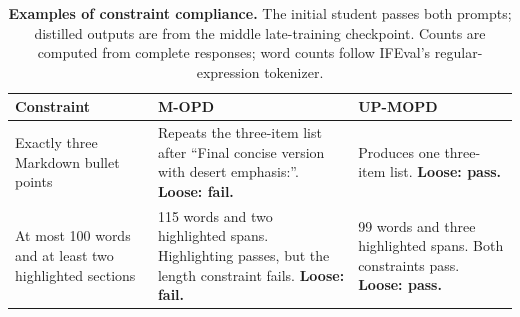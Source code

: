 \documentclass{article}
\begin{document}
\begin{table}[H]
\centering
\small
\setlength{\tabcolsep}{4pt}
\begin{tabularx}{\textwidth}{@{}p{}XX@{}}
\toprule
Constraint & M-OPD & UP-MOPD \\
\midrule
Exactly three Markdown bullet points
& Repeats the three-item list after ``Final concise version with desert emphasis:''. \textbf{Loose: fail.}
& Produces one three-item list. \textbf{Loose: pass.} \\
\addlinespace[5pt]
At most 100 words and at least two highlighted sections
& 115 words and two highlighted spans. Highlighting passes, but the length constraint fails. \textbf{Loose: fail.}
& 99 words and three highlighted spans. Both constraints pass. \textbf{Loose: pass.} \\
\bottomrule
\end{tabularx}
\caption{\textbf{Examples of constraint compliance.} The initial student passes both prompts; distilled outputs are from the middle late-training checkpoint. Counts are computed from complete responses; word counts follow IFEval's regular-expression tokenizer.}
\label{tab:ifeval-cases}
\end{table}
\end{document}
